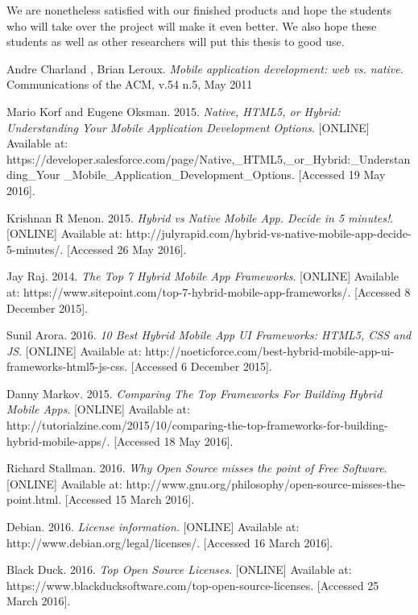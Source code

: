 \documentclass{eplmastersthesis}
\begin{document}
We are nonetheless satisfied with our finished products and hope the students who will take over the project will make it even better. We also hope these students as well as other researchers will put this thesis to good use.\\
\begin{thebibliography}{9}

\bibitem{} 
Andre Charland , Brian Leroux.
\textit{Mobile application development: web vs. native}. 
Communications of the ACM, v.54 n.5, May 2011  

\bibitem{} 
Mario Korf and Eugene Oksman. 2015.
\textit{Native, HTML5, or Hybrid: Understanding Your Mobile Application Development Options}.
[ONLINE] Available at: https://developer.salesforce.com/page/Native,\_HTML5,\_or\_Hybrid:\_Understanding\_Your
\_Mobile\_Application\_Development\_Options. [Accessed 19 May 2016].


\bibitem{} 
Krishnan R Menon. 2015.
\textit{Hybrid vs Native Mobile App. Decide in 5 minutes!}.
[ONLINE] Available at: http://julyrapid.com/hybrid-vs-native-mobile-app-decide-5-minutes/. [Accessed 26 May 2016].
 
\bibitem{}
Jay Raj. 2014. 
\textit{The Top 7 Hybrid Mobile App Frameworks}. 
[ONLINE] Available at: https://www.sitepoint.com/top-7-hybrid-mobile-app-frameworks/. [Accessed 8 December 2015].

\bibitem{}
Sunil Arora. 2016. 
\textit{10 Best Hybrid Mobile App UI Frameworks: HTML5, CSS and JS}. 
[ONLINE] Available at: http://noeticforce.com/best-hybrid-mobile-app-ui-frameworks-html5-js-css. [Accessed 6 December 2015].

\bibitem{} 
Danny Markov. 2015.
\textit{Comparing The Top Frameworks For Building Hybrid Mobile Apps}.
[ONLINE] Available at: http://tutorialzine.com/2015/10/comparing-the-top-frameworks-for-building-hybrid-mobile-apps/. [Accessed 18 May 2016].

\bibitem{} 
Richard Stallman. 2016.
\textit{Why Open Source misses the point of Free Software}.
[ONLINE] Available at: http://www.gnu.org/philosophy/open-source-misses-the-point.html. [Accessed 15 March 2016].

\bibitem{} 
Debian. 2016. 
\textit{License information}.
[ONLINE] Available at: http://www.debian.org/legal/licenses/. [Accessed 16 March 2016].

\bibitem{} 
Black Duck. 2016.
\textit{Top Open Source Licenses}. 
[ONLINE] Available at: https://www.blackducksoftware.com/top-open-source-licenses. [Accessed 25 March 2016].


\end{thebibliography}
\end{document}
